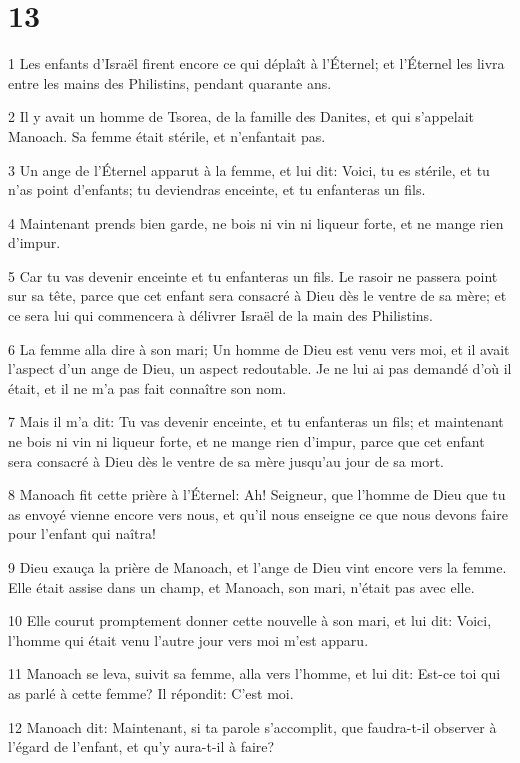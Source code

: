 \chapter{13}

\par 1 Les enfants d'Israël firent encore ce qui déplaît à l'Éternel; et l'Éternel les livra entre les mains des Philistins, pendant quarante ans.
\par 2 Il y avait un homme de Tsorea, de la famille des Danites, et qui s'appelait Manoach. Sa femme était stérile, et n'enfantait pas.
\par 3 Un ange de l'Éternel apparut à la femme, et lui dit: Voici, tu es stérile, et tu n'as point d'enfants; tu deviendras enceinte, et tu enfanteras un fils.
\par 4 Maintenant prends bien garde, ne bois ni vin ni liqueur forte, et ne mange rien d'impur.
\par 5 Car tu vas devenir enceinte et tu enfanteras un fils. Le rasoir ne passera point sur sa tête, parce que cet enfant sera consacré à Dieu dès le ventre de sa mère; et ce sera lui qui commencera à délivrer Israël de la main des Philistins.
\par 6 La femme alla dire à son mari; Un homme de Dieu est venu vers moi, et il avait l'aspect d'un ange de Dieu, un aspect redoutable. Je ne lui ai pas demandé d'où il était, et il ne m'a pas fait connaître son nom.
\par 7 Mais il m'a dit: Tu vas devenir enceinte, et tu enfanteras un fils; et maintenant ne bois ni vin ni liqueur forte, et ne mange rien d'impur, parce que cet enfant sera consacré à Dieu dès le ventre de sa mère jusqu'au jour de sa mort.
\par 8 Manoach fit cette prière à l'Éternel: Ah! Seigneur, que l'homme de Dieu que tu as envoyé vienne encore vers nous, et qu'il nous enseigne ce que nous devons faire pour l'enfant qui naîtra!
\par 9 Dieu exauça la prière de Manoach, et l'ange de Dieu vint encore vers la femme. Elle était assise dans un champ, et Manoach, son mari, n'était pas avec elle.
\par 10 Elle courut promptement donner cette nouvelle à son mari, et lui dit: Voici, l'homme qui était venu l'autre jour vers moi m'est apparu.
\par 11 Manoach se leva, suivit sa femme, alla vers l'homme, et lui dit: Est-ce toi qui as parlé à cette femme? Il répondit: C'est moi.
\par 12 Manoach dit: Maintenant, si ta parole s'accomplit, que faudra-t-il observer à l'égard de l'enfant, et qu'y aura-t-il à faire?
